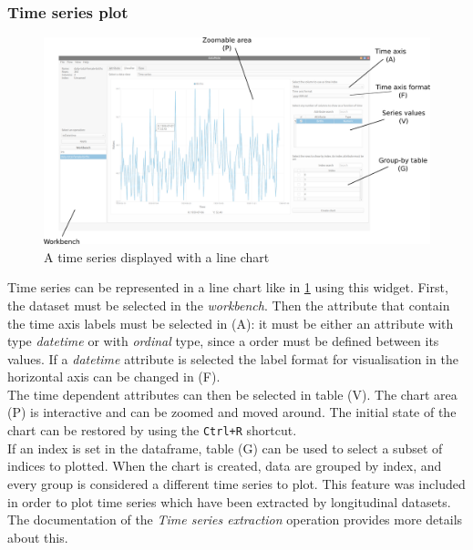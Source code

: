 \subsubsection{Time series plot}
\begin{figure}
	\centering
	\includegraphics[width=\textwidth]{time-series-births}
	\caption{A time series displayed with a line chart}
	\label{fig:time-series-births}
\end{figure}
Time series can be represented in a line chart like in \cref{fig:time-series-births} using this widget. First, the dataset must be selected in the \textit{workbench}. Then the attribute that contain the time axis labels must be selected in (A): it must be either an attribute with type \textit{datetime} or with \textit{ordinal} type, since a order must be defined between its values. If a \textit{datetime} attribute is selected the label format for visualisation in the horizontal axis can be changed in (F).\\ 
The time dependent attributes can then be selected in table (V). The chart area (P) is interactive and can be zoomed and moved around. The initial state of the chart can be restored by using the \lstinline[language=bash]|Ctrl+R| shortcut.\\
If an index is set in the dataframe, table (G) can be used to select a subset of indices to plotted. When the chart is created, data are grouped by index, and every group is considered a different time series to plot. This feature was included in order to plot time series which have been extracted by longitudinal datasets. The documentation of the \textit{Time series extraction} operation provides more details about this.

